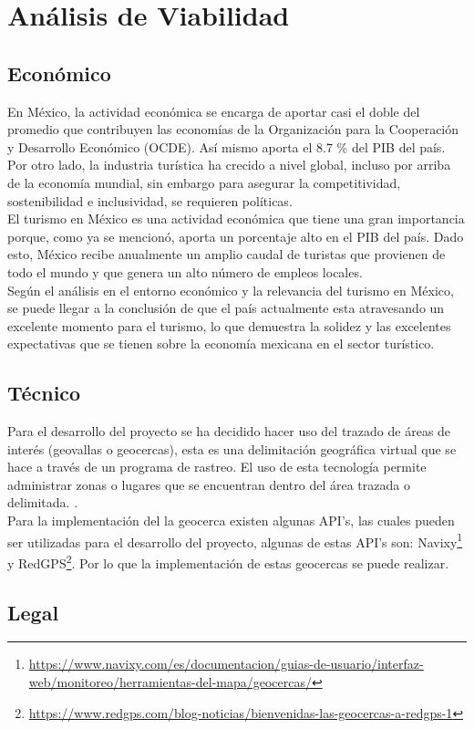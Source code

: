 \section{Análisis de Viabilidad}

\subsection{Económico}

En México, la actividad económica se encarga de aportar casi el doble del promedio que contribuyen las economías de la Organización para la Cooperación y Desarrollo Económico (OCDE). Así mismo aporta el 8.7 \% del PIB del país. \\

Por otro lado, la industria turística ha crecido a nivel global, incluso por arriba de la economía mundial, sin embargo para asegurar la competitividad, sostenibilidad e inclusividad, se requieren políticas. \cite{turismoEnMexico}\\ 

El turismo en México es una actividad económica que tiene una gran importancia porque, como ya se mencionó, aporta un porcentaje alto en el PIB del país. Dado esto, México recibe anualmente un amplio caudal de turistas que provienen de todo el mundo y que genera un alto número de empleos locales.\cite{importanciaTurismo} \\

Según el análisis en el entorno económico y la relevancia del turismo en México, se puede llegar a la conclusión de que el país actualmente esta atravesando un excelente momento para el turismo, lo que demuestra la solidez y las excelentes expectativas que se tienen sobre la economía mexicana en el sector turístico.\\

\subsection{Técnico}

Para el desarrollo del proyecto se ha decidido hacer uso del trazado de áreas de interés (geovallas o geocercas), esta es una delimitación geográfica virtual que se hace a través de un programa de rastreo. El uso de esta tecnología permite administrar zonas o lugares que se encuentran dentro del área trazada o delimitada. \cite{geovalla}. \\

Para la implementación del la geocerca existen algunas API's, las cuales pueden ser utilizadas para el desarrollo del proyecto, algunas de estas API's son: Navixy\footnote{\url{https://www.navixy.com/es/documentacion/guias-de-usuario/interfaz-web/monitoreo/herramientas-del-mapa/geocercas/}} y RedGPS\footnote{\url{https://www.redgps.com/blog-noticias/bienvenidas-las-geocercas-a-redgps-1}}. Por lo que la implementación de estas geocercas se puede realizar.

 \subsection{Legal}


